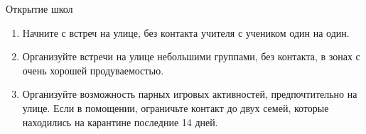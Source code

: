 \documentclass[onecolumn,journal]{IEEEtran}
\begin{document}
\begin{multicols}{2}
Открытие школ
\begin{enumerate}
\item Начните с встреч на улице, без контакта учителя с учеником один на один.
\item Организуйте встречи на улице небольшими группами, без контакта, в зонах с очень хорошей продуваемостью.
\item Организуйте возможность парных игровых активностей, предпочтительно на улице. Если в помощении, ограничьте контакт до двух семей, которые находились на карантине последние 14 дней.
\end{enumerate}

\end{multicols}




% 
\end{document}

